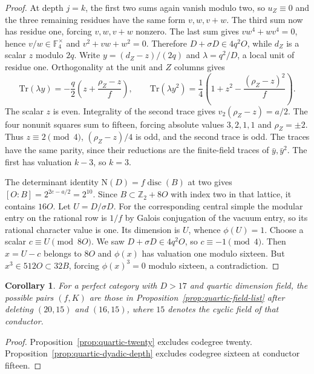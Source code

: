 \documentclass[11pt,a4paper]{article}
\newtheorem{corollary}[theorem]{Corollary}
\numberwithin{equation}{section}
\begin{document}
\begin{proof}
At depth $j=k$, the first two sums again vanish modulo two, so $u_Z\equiv0$ and the three remaining residues have the same form $v,w,v+w$. The third sum now has residue one, forcing $v,w,v+w$ nonzero. The last sum gives $vw^4+wv^4=0$, hence $v/w\in\mathbb F_4^\times$ and $v^2+vw+w^2=0$. Therefore $D+\sigma D\in4q^2O$, while $d_Z$ is a scalar $z$ modulo $2q$. Write $y=(d_Z-z)/(2q)$ and $\lambda=q^2/D$, a local unit of residue one. Orthogonality at the unit and $Z$ columns gives
\[
 \mathrm{Tr}(\lambda y)=-\frac q2\left(z+\frac{\rho_Z-z}{f}\right),\qquad
 \mathrm{Tr}(\lambda y^2)=\frac14\left(1+z^2-\frac{(\rho_Z-z)^2}{f}\right).
\]
The scalar $z$ is even. Integrality of the second trace gives $v_2(\rho_Z-z)=a/2$. The four nonunit squares sum to fifteen, forcing absolute values $3,2,1,1$ and $\rho_Z=\pm2$. Thus $z\equiv2\pmod4$, $(\rho_Z-z)/4$ is odd, and the second trace is odd. The traces have the same parity, since their reductions are the finite-field traces of $\bar y,\bar y^2$. The first has valuation $k-3$, so $k=3$.

The determinant identity $\mathrm N(D)=f\operatorname{disc}(B)$ at two gives $[O:B]=2^{2e-a/2}=2^{10}$. Since $B\subset\mathbb Z_2+8O$ with index two in that lattice, it contains $16O$. Let $U=D/\sigma D$. For the corresponding central simple the modular entry on the rational row is $1/f$ by Galois conjugation of the vacuum entry, so its rational character value is one. Its dimension is $U$, whence $\phi(U)=1$. Choose a scalar $c\equiv U\pmod{8O}$. We saw $D+\sigma D\in4q^2O$, so $c\equiv-1\pmod4$. Then $x=U-c$ belongs to $8O$ and $\phi(x)$ has valuation one modulo sixteen. But $x^3\in512O\subset32B$, forcing $\phi(x)^3=0$ modulo sixteen, a contradiction.
\end{proof}



\begin{corollary}\label{cor:quartic-coupled}
For a perfect category with $D>17$ and quartic dimension field, the possible pairs $(f,K)$ are those in Proposition~\ref{prop:quartic-field-list} after deleting $(20,15)$ and $(16,15)$, where $15$ denotes the cyclic field of that conductor.
\end{corollary}
\begin{proof}
Proposition~\ref{prop:quartic-twenty} excludes codegree twenty. Proposition~\ref{prop:quartic-dyadic-depth} excludes codegree sixteen at conductor fifteen.
\end{proof}
\end{document}
